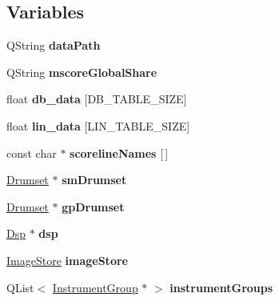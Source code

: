 \subsection*{Variables}
\begin{DoxyCompactItemize}
\item 
\mbox{\label{namespace_ms_a0fb337bbbacdbf67ec6c1d84f4de8048}} 
Q\+String {\bfseries data\+Path}
\item 
\mbox{\label{namespace_ms_a379f0a55e20dc5cc92e40deb947f3db9}} 
Q\+String {\bfseries mscore\+Global\+Share}
\item 
\mbox{\label{namespace_ms_a72f98386a6fe2d954b0cf6ca5fe10508}} 
float {\bfseries db\+\_\+data} \mbox{[}D\+B\+\_\+\+T\+A\+B\+L\+E\+\_\+\+S\+I\+ZE\mbox{]}
\item 
\mbox{\label{namespace_ms_a87ba062732f311210438294c8e9a8cde}} 
float {\bfseries lin\+\_\+data} \mbox{[}L\+I\+N\+\_\+\+T\+A\+B\+L\+E\+\_\+\+S\+I\+ZE\mbox{]}
\item 
const char $\ast$ {\bfseries scoreline\+Names} \mbox{[}$\,$\mbox{]}
\item 
\mbox{\label{namespace_ms_ac7d68ddecdb8c56779336f25b5d26d95}} 
\hyperlink{class_ms_1_1_drumset}{Drumset} $\ast$ {\bfseries sm\+Drumset}
\item 
\mbox{\label{namespace_ms_aaba90cb3248d1eb5bcb740ee56704a10}} 
\hyperlink{class_ms_1_1_drumset}{Drumset} $\ast$ {\bfseries gp\+Drumset}
\item 
\mbox{\label{namespace_ms_a261ce81df4c429359fa37f0e517579fb}} 
\hyperlink{class_ms_1_1_dsp}{Dsp} $\ast$ {\bfseries dsp}
\item 
\mbox{\label{namespace_ms_a92047f2c122af1c8df8f05cef55b7388}} 
\hyperlink{class_ms_1_1_image_store}{Image\+Store} {\bfseries image\+Store}
\item 
\mbox{\label{namespace_ms_a76f164a74e0a977825e5d714a54b45b2}} 
Q\+List$<$ \hyperlink{struct_ms_1_1_instrument_group}{Instrument\+Group} $\ast$ $>$ {\bfseries instrument\+Groups}
\item 
\mbox{\label{namespace_ms_a52501d41c8915aa45e6b356c91fce3aa}} 

\end{DoxyCompactItemize}
